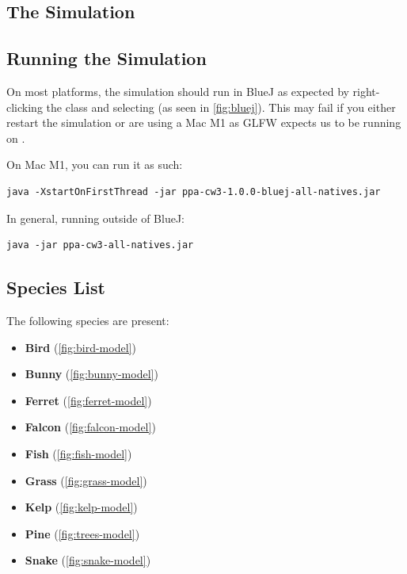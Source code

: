 \documentclass{article}
\begin{document}
    \begin{multicols}{2}
        \section{The Simulation}

        \subsection{Running the Simulation}

            On most platforms, the simulation should run in BlueJ \cite{BlueJ} as expected by right-clicking the  class and selecting  (as seen in \autoref{fig:bluej}).
            This may fail if you either restart the simulation or are using a Mac M1 as GLFW expects us to be running on .

            On Mac M1, you can run it as such:

            \begin{lstlisting}
java -XstartOnFirstThread -jar ppa-cw3-1.0.0-bluej-all-natives.jar\end{lstlisting}

            In general, running outside of BlueJ:

            \begin{lstlisting}
java -jar ppa-cw3-all-natives.jar\end{lstlisting}

        \subsection{Species List}

            The following species are present:

            \begin{itemize}
                \setlength\itemsep{0.01em}
                \item \textbf{Bird} (\autoref{fig:bird-model})
                \item \textbf{Bunny} (\autoref{fig:bunny-model})
                \item \textbf{Ferret} (\autoref{fig:ferret-model})
                \item \textbf{Falcon} (\autoref{fig:falcon-model})
                \item \textbf{Fish} (\autoref{fig:fish-model})
                \item \textbf{Grass} (\autoref{fig:grass-model})
                \item \textbf{Kelp} (\autoref{fig:kelp-model})
                \item \textbf{Pine} (\autoref{fig:trees-model})
                \item \textbf{Snake} (\autoref{fig:snake-model})
            \end{itemize}


\end{multicols}
\end{document}
